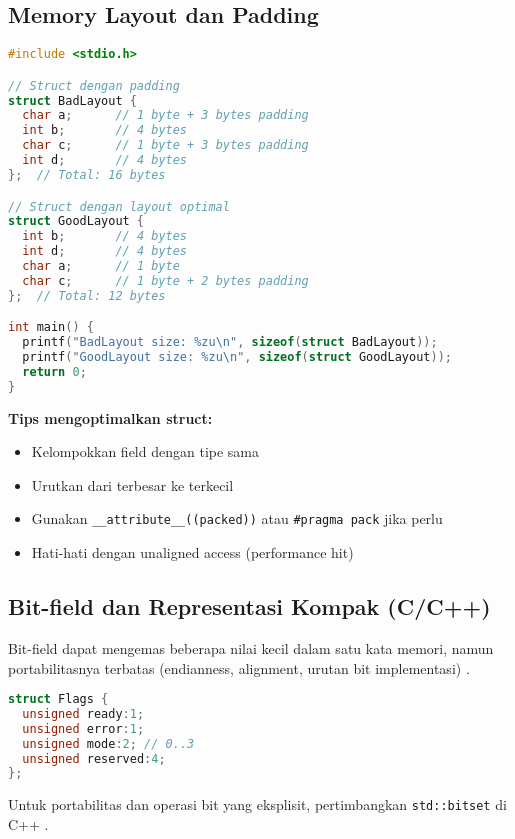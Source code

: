 \documentclass[../main.tex]{subfiles}
\begin{document}
\subsection{Memory Layout dan Padding}

\begin{lstlisting}[language=C, caption={Struct padding di C}]
#include <stdio.h>

// Struct dengan padding
struct BadLayout {
  char a;      // 1 byte + 3 bytes padding
  int b;       // 4 bytes
  char c;      // 1 byte + 3 bytes padding
  int d;       // 4 bytes
};  // Total: 16 bytes

// Struct dengan layout optimal
struct GoodLayout {
  int b;       // 4 bytes
  int d;       // 4 bytes
  char a;      // 1 byte
  char c;      // 1 byte + 2 bytes padding
};  // Total: 12 bytes

int main() {
  printf("BadLayout size: %zu\n", sizeof(struct BadLayout));
  printf("GoodLayout size: %zu\n", sizeof(struct GoodLayout));
  return 0;
}
\end{lstlisting}

\textbf{Tips mengoptimalkan struct:}
\begin{itemize}
  \item Kelompokkan field dengan tipe sama
  \item Urutkan dari terbesar ke terkecil
  \item Gunakan \texttt{\_\_attribute\_\_((packed))} atau \texttt{\#pragma pack} jika perlu
  \item Hati-hati dengan unaligned access (performance hit)
\end{itemize}

\subsection{Bit-field dan Representasi Kompak (C/C++)}
Bit-field dapat mengemas beberapa nilai kecil dalam satu kata memori, namun portabilitasnya terbatas (endianness, alignment, urutan bit implementasi) \parencite{c-bitfield,cpp-bitfield}.

\begin{lstlisting}[language=C, caption={Bit-field untuk flags (C)}]
struct Flags {
  unsigned ready:1;
  unsigned error:1;
  unsigned mode:2; // 0..3
  unsigned reserved:4;
};
\end{lstlisting}

Untuk portabilitas dan operasi bit yang eksplisit, pertimbangkan \texttt{std::bitset} di C++ \parencite{cpp-bitset}.
\end{document}
